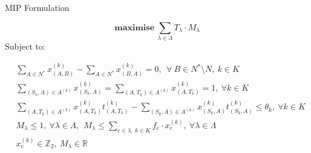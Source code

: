 \documentclass[handout]{beamer}
\begin{document}
\begin{frame}{MIP Formulation}

$$\textbf{maximise}\ \sum\limits_{\lambda \in \Lambda}T_{\lambda} \cdot M_{\lambda}$$
Subject to:

\begin{align}
	&\sum\limits_{A \in N^*}x^{(k)}_{(A,B)} - \sum\limits_{A \in N^*}x^{(k)}_{(B,A)} =0,\  \ \forall\ B \in N^* \setminus N,\ k \in K\\
	&\sum\limits_{(S_k,A) \in A^{(k)}}x^{(k)}_{(S_k,A)} = \sum\limits_{(A,T_k) \in A^{(k)}}x^{(k)}	_{(A,T_k)} = 1,\ \forall k \in K\\
	&\sum\limits_{(A,T_k) \in A^{(k)}}x^{(k)}	_{(A,T_k)}t^{(k)}_{(A,T_k)} - \sum\limits_{(S_k,A) \in A^{(k)}}x^{(k)}_{(S_k,A)}t^{(k)}_{(S_k,A)} \leq \theta_k,\ \forall k \in K\\
	&M_{\lambda} \leq 1,\ \forall \lambda \in \Lambda,\ \
	M_{\lambda} \leq \sum\limits_{e \in \lambda,\ k \in K}f_e \cdot x^{(k)}_{e},\ \forall \lambda \in \Lambda\\
	&x^{(k)}_{e} \in \mathbb{Z}_2,\  M_{\lambda} \in \mathbb{R}
\end{align}
\end{frame}

\end{document}
